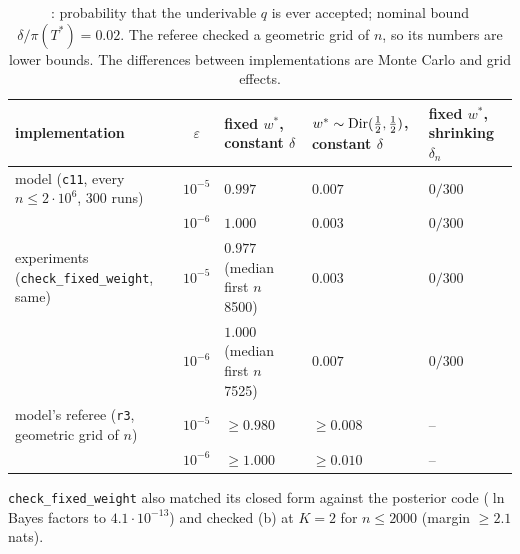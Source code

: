 \begin{table}[ht]
\centering\footnotesize
\begin{tabularx}{\textwidth}{@{}>{\raggedright\arraybackslash}Xc>{\centering\arraybackslash}p{2.3cm}>{\centering\arraybackslash}p{2.5cm}>{\centering\arraybackslash}p{2.1cm}@{}}
\toprule
implementation & $\varepsilon$ & fixed $w^*$, constant $\delta$ & $w^*\sim\mathrm{Dir}(\tfrac12,\tfrac12)$, constant $\delta$ & fixed $w^*$, shrinking $\delta_n$\\
\midrule
model (\texttt{c11}, every $n\le2\cdot10^6$, 300 runs) & $10^{-5}$ & $0.997$ & $0.007$ & $0/300$\\
 & $10^{-6}$ & $1.000$ & $0.003$ & $0/300$\\
experiments (\texttt{check\_fixed\_weight}, same) & $10^{-5}$ & $0.977$ (median first $n$ 8500) & $0.003$ & $0/300$\\
 & $10^{-6}$ & $1.000$ (median first $n$ 7525) & $0.007$ & $0/300$\\
model's referee (\texttt{r3}, geometric grid of $n$) & $10^{-5}$ & $\ge0.980$ & $\ge0.008$ & --\\
 & $10^{-6}$ & $\ge1.000$ & $\ge0.010$ & --\\
\bottomrule
\end{tabularx}
\caption{: probability that the underivable $q$ is ever accepted; nominal bound $\delta/\pi(T^*)=0.02$. The referee checked a geometric grid of $n$, so its numbers are lower bounds. The differences between implementations are Monte Carlo and grid effects.}\label{tab:sound:constant}
\end{table}

\noindent \texttt{check\_fixed\_weight} also matched its closed form against the posterior code ($\ln$ Bayes factors to $4.1\cdot10^{-13}$) and checked (b) at $K=2$ for $n\le2000$ (margin $\ge2.1$ nats).
